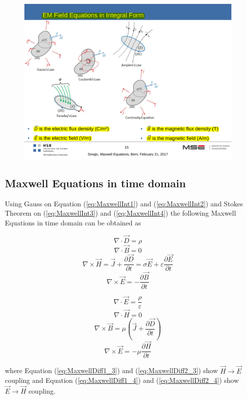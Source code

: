 \begin{figure}[h!]
	\centering
	\includegraphics[width=.55\textwidth]{./images/MaxwellEqImages.pdf}
\end{figure}

\subsection{Maxwell Equations in time domain}
Using Gauss on Equation (\ref{eq:MaxwellInt1}) and (\ref{eq:MaxwellInt2}) and Stokes Theorem on (\ref{eq:MaxwellInt3}) and (\ref{eq:MaxwellInt4}) the following Maxwell Equations in time domain can be obtained as 
\begin{multicols}{2}
	\begin{equation}
		\nabla \cdot \vec{D} = \rho
		\label{eq:MaxwellDiff1_1}
	\end{equation}
	\begin{equation}
		\nabla \cdot \vec{B} = 0
		\label{eq:MaxwellDiff1_2}
	\end{equation}
	\begin{equation}
		\nabla \times \vec{H} = \vec{J} + \frac{\partial \vec{D}}{\partial t} = \sigma \vec{E} + \varepsilon \frac{\partial \vec{E}}{\partial t}
		\label{eq:MaxwellDiff1_3}
	\end{equation}
	\begin{equation}
		\nabla \times \vec{E} = - \frac{\partial \vec{B}}{\partial t}
		\label{eq:MaxwellDiff1_4}
	\end{equation}
	
	\begin{equation}
		\nabla \cdot \vec{E} = \frac{\rho}{\varepsilon}
		\label{eq:MaxwellDiff2_1}
	\end{equation}
	\begin{equation}
		\nabla \cdot \vec{H} = 0
		\label{eq:MaxwellDiff2_2}
	\end{equation}
	\begin{equation}
		\nabla \times \vec{B} = \mu\left(\vec{J} + \frac{\partial \vec{D}}{\partial t}\right)
		\label{eq:MaxwellDiff2_3}
	\end{equation}
	\begin{equation}
		\nabla \times \vec{E} = -\mu \frac{\partial \vec{H}}{\partial t}
		\label{eq:MaxwellDiff2_4}
	\end{equation}
\end{multicols}
where Equation (\ref{eq:MaxwellDiff1_3}) and (\ref{eq:MaxwellDiff2_3}) show $\vec{H} \rightarrow \vec{E}$ coupling and Equation (\ref{eq:MaxwellDiff1_4}) and (\ref{eq:MaxwellDiff2_4}) show $\vec{E} \rightarrow \vec{H}$ coupling.

